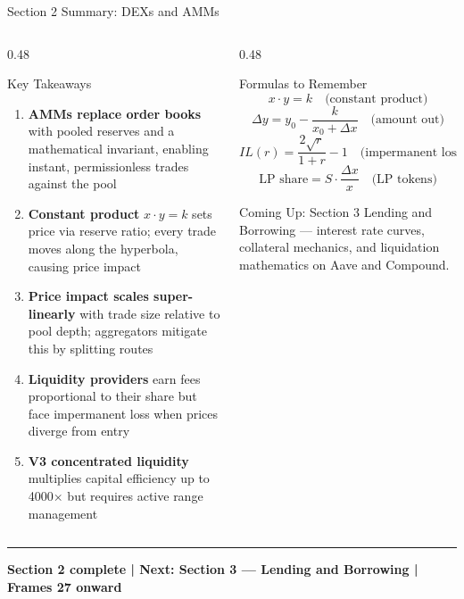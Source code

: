 \documentclass[8pt,aspectratio=169]{beamer}
\newcommand{\bottomnote}[1]{\vfill\vspace{-2mm}\textcolor{mllavender2}{\rule{\textwidth}{0.4pt}}\vspace{1mm}\footnotesize\textbf{#1}}
\begin{document}
\begin{frame}{Section 2 Summary: DEXs and AMMs}
  \begin{columns}[T]
    \begin{column}{0.48\textwidth}
      \begin{block}{Key Takeaways}
        \begin{enumerate}\setlength\itemsep{4pt}
          \item \textbf{AMMs replace order books} with pooled reserves and a mathematical invariant,
                enabling instant, permissionless trades against the pool
          \item \textbf{Constant product} $x \cdot y = k$ sets price via reserve ratio; every trade
                moves along the hyperbola, causing price impact
          \item \textbf{Price impact scales super-linearly} with trade size relative to pool depth;
                aggregators mitigate this by splitting routes
          \item \textbf{Liquidity providers} earn fees proportional to their share but face
                impermanent loss when prices diverge from entry
          \item \textbf{V3 concentrated liquidity} multiplies capital efficiency up to 4000$\times$
                but requires active range management
        \end{enumerate}
      \end{block}
    \end{column}
    \begin{column}{0.48\textwidth}
      \begin{block}{Formulas to Remember}
        \[
          x \cdot y = k \quad \text{(constant product)}
        \]
        \[
          \Delta y = y_0 - \frac{k}{x_0 + \Delta x} \quad \text{(amount out)}
        \]
        \[
          IL(r) = \frac{2\sqrt{r}}{1+r} - 1 \quad \text{(impermanent loss)}
        \]
        \[
          \text{LP share} = S \cdot \frac{\Delta x}{x} \quad \text{(LP tokens)}
        \]
      \end{block}
      \vspace{3mm}
      \begin{alertblock}{Coming Up: Section 3}
        Lending and Borrowing --- interest rate curves, collateral mechanics, and liquidation
        mathematics on Aave and Compound.
      \end{alertblock}
    \end{column}
  \end{columns}
  \bottomnote{Section 2 complete | Next: Section 3 --- Lending and Borrowing | Frames 27 onward}
\end{frame}
\end{document}
